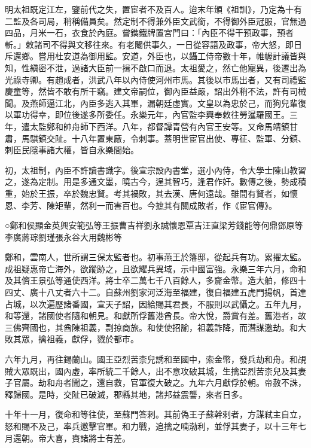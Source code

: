 
\begin{pinyinscope}
明太祖既定江左，鑒前代之失，置宦者不及百人。迨末年頒《祖訓》，乃定為十有二監及各司局，稍稱備員矣。然定制不得兼外臣文武銜，不得御外臣冠服，官無過四品，月米一石，衣食於內庭。嘗鐫鐵牌置宮門曰：「內臣不得干預政事，預者斬。」敕諸司不得與文移往來。有老閹供事久，一日從容語及政事，帝大怒，即日斥還鄉。嘗用杜安道為御用監。安道，外臣也，以鑷工侍帝數十年，帷幄計議皆與知，性縝密不泄，過諸大臣前一揖不啟口而退。太祖愛之，然亡他寵異，後遷出為光祿寺卿。有趙成者，洪武八年以內侍使河州市馬。其後以市馬出者，又有司禮監慶童等，然皆不敢有所干竊。建文帝嗣位，御內臣益嚴，詔出外稍不法，許有司械聞。及燕師逼江北，內臣多逃入其軍，漏朝廷虛實。文皇以為忠於己，而狗兒輩復以軍功得幸，即位後遂多所委任。永樂元年，內官監李興奉敕往勞暹羅國王。三年，遣太監鄭和帥舟師下西洋。八年，都督譚青營有內官王安等。又命馬靖鎮甘肅，馬騏鎮交阯。十八年置東廠，令刺事。蓋明世宦官出使、專征、監軍、分鎮、刺臣民隱事諸大權，皆自永樂間始。

初，太祖制，內臣不許讀書識字。後宣宗設內書堂，選小內侍，令大學士陳山教習之，遂為定制。用是多通文墨，曉古今，逞其智巧，逢君作奸。數傳之後，勢成積重，始於王振，卒於魏忠賢。考其禍敗，其去漢、唐何遠哉。雖間有賢者，如懷恩、李芳、陳矩輩，然利一而害百也。今摭其有關成敗者，作《宦官傳》。

○鄭和侯顯金英興安範弘等王振曹吉祥劉永誠懷恩覃吉汪直梁芳錢能等何鼎鄧原等李廣蔣琮劉瑾張永谷大用魏彬等

鄭和，雲南人，世所謂三保太監者也。初事燕王於籓邸，從起兵有功。累擢太監。成祖疑惠帝亡海外，欲蹤跡之，且欲耀兵異域，示中國富強。永樂三年六月，命和及其儕王景弘等通使西洋。將士卒二萬七千八百餘人，多齎金幣。造大舶，修四十四丈、廣十八丈者六十二。自蘇州劉家河泛海至福建，復自福建五虎門揚帆，首達占城，以次遍歷諸番國，宣天子詔，因給賜其君長，不服則以武懾之。五年九月，和等還，諸國使者隨和朝見。和獻所俘舊港酋長。帝大悅，爵賞有差。舊港者，故三佛齊國也，其酋陳祖義，剽掠商旅。和使使招諭，祖義詐降，而潛謀邀劫。和大敗其眾，擒祖義，獻俘，戮於都市。

六年九月，再往錫蘭山。國王亞烈苦柰兒誘和至國中，索金幣，發兵劫和舟。和覘賊大眾既出，國內虛，率所統二千餘人，出不意攻破其城，生擒亞烈苦柰兒及其妻子官屬。劫和舟者聞之，還自救，官軍復大破之。九年六月獻俘於朝。帝赦不誅，釋歸國。是時，交阯已破滅，郡縣其地，諸邦益震讋，來者日多。

十年十一月，復命和等往使，至蘇門答剌。其前偽王子蘇幹剌者，方謀弒主自立，怒和賜不及己，率兵邀擊官軍。和力戰，追擒之喃渤利，並俘其妻子，以十三年七月還朝。帝大喜，賚諸將士有差。


\end{pinyinscope}
